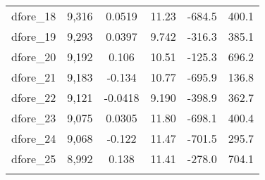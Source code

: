 \begin{tabular}{lccccc}
dfore\_18 & 9,316 & 0.0519 & 11.23 & -684.5 & 400.1 \\
dfore\_19 & 9,293 & 0.0397 & 9.742 & -316.3 & 385.1 \\
dfore\_20 & 9,192 & 0.106 & 10.51 & -125.3 & 696.2 \\
dfore\_21 & 9,183 & -0.134 & 10.77 & -695.9 & 136.8 \\
dfore\_22 & 9,121 & -0.0418 & 9.190 & -398.9 & 362.7 \\
dfore\_23 & 9,075 & 0.0305 & 11.80 & -698.1 & 400.4 \\
dfore\_24 & 9,068 & -0.122 & 11.47 & -701.5 & 295.7 \\
dfore\_25 & 8,992 & 0.138 & 11.41 & -278.0 & 704.1 \\
 &  &  &  &  &  \\ \hline
\end{tabular}
